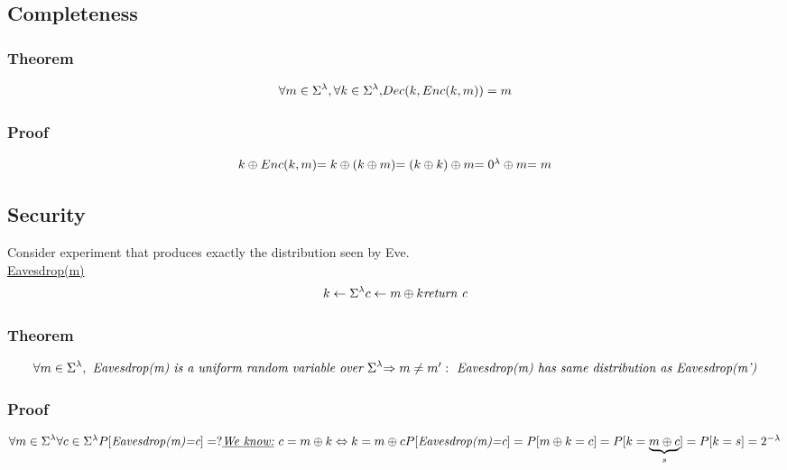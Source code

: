 \documentclass{report}
\begin{document}
 \subsection{Completeness}
 \subsubsection{Theorem}
 \[
 	\forall m \in \Sigma ^{\lambda}, \forall k \in \Sigma ^{\lambda}, $$ $$
 	Dec(k, Enc(k,m)) = m
 \]
 \subsubsection{Proof}
 \[
 	k \oplus Enc(k,m) $$ $$
 	= k \oplus (k \oplus m) $$ $$
 	= (k \oplus k) \oplus m $$ $$
 	= 0^{\lambda} \oplus m $$ $$
 	= m
 \]
 
 \subsection{Security}
 Consider experiment that produces exactly the distribution seen by Eve. \\
 \underline{Eavesdrop(m)} \\
 \[
 	k \leftarrow \Sigma ^{\lambda} $$ $$
 	c \leftarrow m \oplus k $$ $$
 	\textit{return c}
 \]
 \subsubsection{Theorem}
 \[
 	\forall m \in \Sigma ^{\lambda}, \textit{ Eavesdrop(m) is a uniform random variable over } \Sigma ^{\lambda} $$ $$
 	\Rightarrow m \neq m': \textit{ Eavesdrop(m) has same distribution as Eavesdrop(m')}
 \]
 \subsubsection{Proof}
 \[
 	\forall m \in \Sigma ^{\lambda} $$ $$
 	\forall c \in \Sigma ^{\lambda} $$ $$
 	P[\textit{Eavesdrop(m)=c}] = ? $$ $$
 	\textit{\underline{We know:} } c = m \oplus k \Leftrightarrow k = m \oplus c $$ $$
 	P[\textit{Eavesdrop(m)=c}] = P[m \oplus k = c] = P[k = \underbrace{m \oplus c}_s ] = P[k=s] = 2^{- \lambda}
 \]
 
 
\end{document}
